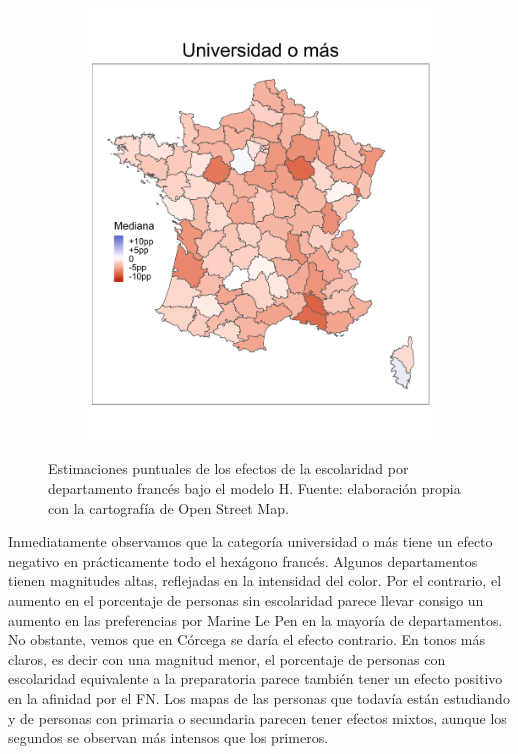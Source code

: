 \begin{figure}
\begin{subfigure}{0.275\textwidth}
	\includegraphics[width = \textwidth]{Figs/Efectos/Mapa_Efectos_Dip4_Modelo_H}
	\end{subfigure}
	\caption{Estimaciones puntuales de los efectos de la escolaridad por departamento francés bajo el modelo H. Fuente: elaboración propia con la cartografía de Open Street Map.}
	\label{fig:Mapa_Efectos_Escolaridad}
\end{figure}


Inmediatamente observamos que la categoría universidad o más tiene un efecto negativo en prácticamente todo el hexágono francés. Algunos departamentos tienen magnitudes altas, reflejadas en la intensidad del color. Por el contrario, el aumento en el porcentaje de personas sin escolaridad parece llevar consigo un aumento en las preferencias por Marine Le Pen en la mayoría de departamentos. No obstante, vemos que en Córcega se daría el efecto contrario. En tonos más claros, es decir con una magnitud menor, el porcentaje de personas con escolaridad equivalente a la preparatoria parece también tener un efecto positivo en la afinidad por el FN. Los mapas de las personas que todavía están estudiando y de personas con primaria o secundaria parecen tener efectos mixtos, aunque los segundos se observan más intensos que los primeros.\\

